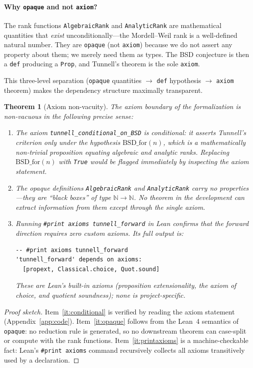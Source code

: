 \documentclass[11pt,a4paper]{article}
\newtheorem{theorem}{Theorem}[section]
\theoremstyle{definition}
\newcommand{\lean}[1]{\texttt{#1}}
\newcommand{\BSDfor}{\mathrm{BSD\_for}}
\begin{document}
\paragraph{Why \lean{opaque} and not \lean{axiom}?}
The rank functions \lean{AlgebraicRank} and \lean{AnalyticRank} are
mathematical quantities that \emph{exist} unconditionally---the
Mordell--Weil rank is a well-defined natural number.  They are
\lean{opaque} (not \lean{axiom}) because we do not assert any
property about them; we merely need them as types.  The BSD
conjecture is then a \lean{def} producing a \lean{Prop}, and
Tunnell's theorem is the sole \lean{axiom}.

This three-level separation (\lean{opaque} quantities $\to$
\lean{def} hypothesis $\to$ \lean{axiom} theorem) makes the
dependency structure maximally transparent.

\begin{theorem}[Axiom non-vacuity]\label{thm:nonvacuity}
The axiom boundary of the formalization is non-vacuous in the
following precise sense:
\begin{enumerate}[nosep]
  \item\label{it:conditional}
    The axiom \lean{tunnell\_conditional\_on\_BSD} is
    \emph{conditional}: it asserts Tunnell's criterion only under
    the hypothesis $\BSDfor(n)$, which is a mathematically
    non-trivial proposition equating algebraic and analytic ranks.
    Replacing $\BSDfor(n)$ with \lean{True} would be flagged
    immediately by inspecting the axiom statement.
  \item\label{it:opaque}
    The opaque definitions \lean{AlgebraicRank} and
    \lean{AnalyticRank} carry no properties---they are
    ``black boxes'' of type $\mathbb{N} \to \mathbb{N}$.  No
    theorem in the development can extract information from them
    except through the single axiom.
  \item\label{it:printaxioms}
    Running \texttt{\#print axioms tunnell\_forward} in Lean
    confirms that the forward direction requires \emph{zero}
    custom axioms.  Its full output is:
\begin{lstlisting}[numbers=none,frame=none,xleftmargin=2em]
-- #print axioms tunnell_forward
'tunnell_forward' depends on axioms:
  [propext, Classical.choice, Quot.sound]
\end{lstlisting}
    These are Lean's built-in axioms (proposition extensionality,
    the axiom of choice, and quotient soundness); none is
    project-specific.
\end{enumerate}
\end{theorem}
\begin{proof}[Proof sketch]
Item~\ref{it:conditional} is verified by reading the axiom
statement (Appendix~\ref{app:code}).  Item~\ref{it:opaque}
follows from the Lean~4 semantics of \lean{opaque}: no reduction
rule is generated, so no downstream theorem can case-split or
compute with the rank functions.  Item~\ref{it:printaxioms} is
a machine-checkable fact: Lean's \texttt{\#print axioms} command
recursively collects all axioms transitively used by a declaration.
\end{proof}
\end{document}
